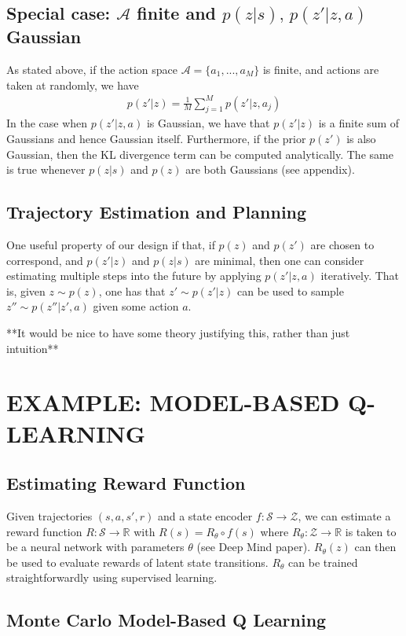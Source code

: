 \documentclass[letterpaper, 10 pt, conference]{ieeeconf}  %
\begin{document}
\subsection{Special case: $\mathcal{A}$ finite and $p(z|s),\,p(z'|z,a)$ Gaussian}
As stated above, if the action space $\mathcal{A} = \{a_1,...,a_M\}$ is finite, and actions are taken at randomly, we have
\begin{align*}
	p(z'|z) = \frac{1}{M}\sum_{j=1}^M p(z'|z, a_j)
\end{align*}
In the case when $p(z'|z,a)$ is Gaussian, we have that $p(z'|z)$ is a finite sum of Gaussians and hence Gaussian itself. Furthermore, if the prior $p(z')$ is also Gaussian, then the KL divergence term can be computed analytically. The same is true whenever $p(z|s)$ and $p(z)$ are both Gaussians (see appendix).

\subsection{Trajectory Estimation and Planning}
One useful property of our design if that, if $p(z)$ and $p(z')$ are chosen to correspond, and $p(z'|z)$ and $p(z|s)$ are minimal, then one can consider estimating multiple steps into the future by applying $p(z'|z,a)$ iteratively. That is, given $z \sim p(z)$, one has that $z' \sim p(z'|z)$ can be used to sample $z''\sim p(z''|z',a)$ given some action $a$.

**It would be nice to have some theory justifying this, rather than just intuition**

\section{EXAMPLE: MODEL-BASED Q-LEARNING}
\subsection{Estimating Reward Function}

Given trajectories $(s,a,s',r)$ and a state encoder $f:\mathcal{S}\rightarrow\mathcal{Z}$, we can estimate a reward function $R: \mathcal{S}\rightarrow \mathbb{R}$ with $R(s) = R_\theta \circ f(s)$ where $R_\theta:\mathcal{Z}\rightarrow \mathbb{R}$ is taken to be a neural network with parameters $\theta$ (see Deep Mind paper). $R_\theta(z)$ can then be used to evaluate rewards of latent state transitions. $R_\theta$ can be trained straightforwardly using supervised learning.

\subsection{Monte Carlo Model-Based Q Learning}
\end{document}

